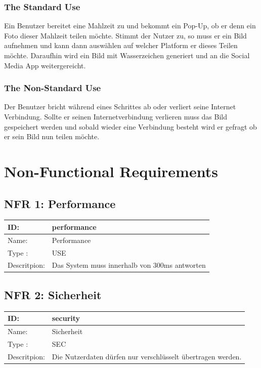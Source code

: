 \documentclass[12pt]{article}
\theoremstyle{definition}
\begin{document}
\subsubsection{The Standard Use}
Ein Benutzer bereitet eine Mahlzeit zu und bekommt ein Pop-Up, ob er denn ein Foto dieser Mahlzeit teilen möchte. Stimmt der Nutzer zu, so muss er ein Bild aufnehmen und kann dann auswählen auf welcher Platform er dieses Teilen möchte. Daraufhin wird ein Bild mit Wasserzeichen generiert und an die Social Media App weitergereicht.

\subsubsection{The Non-Standard Use}
Der Benutzer bricht während eines Schrittes ab oder verliert seine Internet Verbindung. Sollte er seinen Internetverbindung verlieren muss das Bild gespeichert werden und sobald wieder eine Verbindung besteht wird er gefragt ob er sein Bild nun teilen möchte.
\pagebreak


\section{Non-Functional Requirements}

\subsection{NFR 1: Performance}
\begin{tabular}{|p{.2\linewidth}|p{.65\linewidth}|}
\hline 
ID: & performance \\ \hline
Name: & Performance \\ \hline
Type	: & USE \\ \hline
Descritpion: & Das System muss innerhalb von 300ms antworten  \\ \hline
\end{tabular}

\subsection{NFR 2: Sicherheit}
\begin{tabular}{|p{.2\linewidth}|p{.65\linewidth}|}
\hline 
ID: & security \\ \hline
Name: & Sicherheit \\ \hline
Type	: & SEC \\ \hline
Descritpion: & Die Nutzerdaten dürfen nur verschlüsselt übertragen werden.  \\ \hline
\end{tabular}
\end{document}
